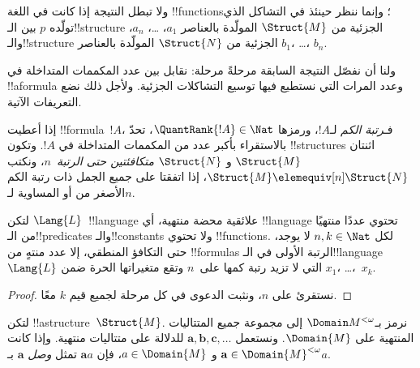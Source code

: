 \documentclass[../../../include/open-logic-section]{subfiles}
\begin{document}
\begin{rem}
ولا تبطل النتيجة إذا كانت في اللغة !!{function}s؛ وإنما ننظر
حينئذ في التشاكل الذي تولّده $p$ بين الـ!!{structure} الجزئية
من $\Struct{M}$ المولّدة بالعناصر $a_1$، \dots، $a_n$،
والـ!!{structure} الجزئية من $\Struct{N}$ المولّدة بالعناصر
$b_1$، \dots، $b_n$.
\end{rem}

ولنا أن نفصّل النتيجة السابقة مرحلةً مرحلة: نقابل بين عدد
المكممات المتداخلة في !!a{formula} وعدد المرات التي نستطيع فيها
توسيع التشاكلات الجزئية. ولأجل ذلك نضع التعريفات الآتية.

\begin{defn}
  إذا أعطيت !!{formula}~$!A$، فـ\emph{رتبة الكم} لـ$!A$، ورمزها
  $\QuantRank{!A} \in \Nat$، تحدّ بالاستقراء بأكبر عدد من المكممات
  المتداخلة في $!A$. وتكون !!{structure}s اثنتان $\Struct{M}$ و
  $\Struct{N}$ \emph{متكافئتين حتى الرتبة~$n$}، ونكتب
  $\Struct{M} \elemequiv[n] \Struct{N}$، إذا اتفقتا على جميع الجمل ذات
  رتبة الكم الأصغر من أو المساوية لـ$n$.
\end{defn}

\begin{prop}
  لتكن $\Lang{L}$~!!{language} علائقية محضة منتهية، أي !!{language}
  تحتوي عددًا منتهيًا من الـ!!{predicate}s والـ!!{constant}s ولا تحتوي
  !!{function}s. لكل $n,k \in \Nat$ لا يوجد، حتى التكافؤ المنطقي، إلا
  عدد منتهٍ من !!{formula}s الرتبة الأولى في الـ!!{language}~$\Lang{L}$ التي لا تزيد
  رتبة كمها على~$n$ وتقع متغيراتها الحرة ضمن $x_1$، \dots،~$x_k$.
\end{prop}

\begin{proof}
  نستقرئ على $n$، ونثبت الدعوى في كل مرحلة لجميع قيم $k$ معًا.
\end{proof}

\begin{defn}
  لتكن !!a{structure}~$\Struct{M}$. نرمز بـ$\Domain M^{<\omega}$ إلى
  مجموعة جميع المتتاليات المنتهية على $\Domain{M}$. ونستعمل
  $\mathbf{a}, \mathbf{b}, \mathbf{c}, \ldots$ للدلالة على متتاليات
  منتهية. وإذا كانت $\mathbf{a} \in \Domain{M}^{<\omega}$ و
  $a \in \Domain{M}$، فإن $\mathbf{a}a$ تمثل \emph{وصل}
  $\mathbf{a}$ بـ$a$.
\end{defn}
\end{document}
